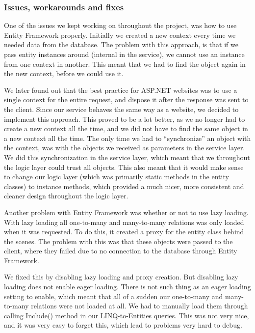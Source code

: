 \subsubsection{Issues, workarounds and fixes}
\label{Implementation_Service_Architecture_Issues}

One of the issues we kept working on throughout the project, was how to use Entity Framework properly. Initially we created a new context every time we needed data from the database. The problem with this approach, is that if we pass entity instances around (internal in the service), we cannot use an instance from one context in another. This meant that we had to find the object again in the new context, before we could use it.

We later found out that the best practice for ASP.NET websites was to use a single context for the entire request, and dispose it after the response was sent to the client. Since our service behaves the same way as a website, we decided to implement this approach. This proved to be a lot better, as we no longer had to create a new context all the time, and we did not have to find the same object in a new context all the time. The only time we had to ``synchronize'' an object with the context, was with the objects we received as parameters in the service layer. We did this synchronization in the service layer, which meant that we throughout the logic layer could trust all objects. This also meant that it would make sense to change our logic layer (which was primarily static methods in the entity classes) to instance methods, which provided a much nicer, more consistent and cleaner design throughout the logic layer.

Another problem with Entity Framework was whether or not to use lazy loading. With lazy loading all one-to-many and many-to-many relations was only loaded when it was requested. To do this, it created a proxy for the entity class behind the scenes. The problem with this was that these objects were passed to the client, where they failed due to no connection to the database through Entity Framework.

We fixed this by disabling lazy loading and proxy creation. But disabling lazy loading does not enable eager loading. There is not such thing as an eager loading setting to enable, which meant that all of a sudden our one-to-many and many-to-many relations were not loaded at all. We had to manually load them through calling Include() method in our LINQ-to-Entities queries. This was not very nice, and it was very easy to forget this, which lead to problems very hard to debug.

